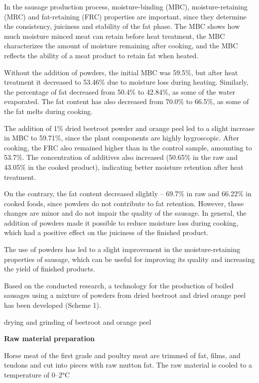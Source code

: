 \begin{multicols}{2}
In the sausage production process, moisture-binding (MBC),
moisture-retaining (MRC) and fat-retaining (FRC) properties are
important, since they determine the consistency, juiciness and stability
of the fat phase. The MBC shows how much moisture minced meat can retain
before heat treatment, the MBC characterizes the amount of moisture
remaining after cooking, and the MBC reflects the ability of a meat
product to retain fat when heated.

Without the addition of powders, the initial MBC was 59.5\%, but after
heat treatment it decreased to 53.46\% due to moisture loss during
heating. Similarly, the percentage of fat decreased from 50.4\% to
42.84\%, as some of the water evaporated. The fat content has also
decreased from 70.0\% to 66.5\%, as some of the fat melts during
cooking.

The addition of 1\% dried beetroot powder and orange peel led to a
slight increase in MBC to 59.71\%, since the plant components are highly
hygroscopic. After cooking, the FRC also remained higher than in the
control sample, amounting to 53.7\%. The concentration of additives also
increased (50.65\% in the raw and 43.05\% in the cooked product),
indicating better moisture retention after heat treatment.

On the contrary, the fat content decreased slightly -- 69.7\% in raw and
66.22\% in cooked foods, since powders do not contribute to fat
retention. However, these changes are minor and do not impair the
quality of the sausage. In general, the addition of powders made it
possible to reduce moisture loss during cooking, which had a positive
effect on the juiciness of the finished product.

The use of powders has led to a slight improvement in the
moisture-retaining properties of sausage, which can be useful for
improving its quality and increasing the yield of finished products.

Based on the conducted research, a technology for the production of
boiled sausages using a mixture of powders from dried beetroot and dried
orange peel has been developed (Scheme 1).

drying and grinding of beetroot and orange peel

{\bfseries Raw material preparation}

Horse meat of the first grade and poultry meat are trimmed of fat,
films, and tendons and cut into pieces with raw mutton fat. The raw
material is cooled to a temperature of 0--2°C


\end{multicols}
